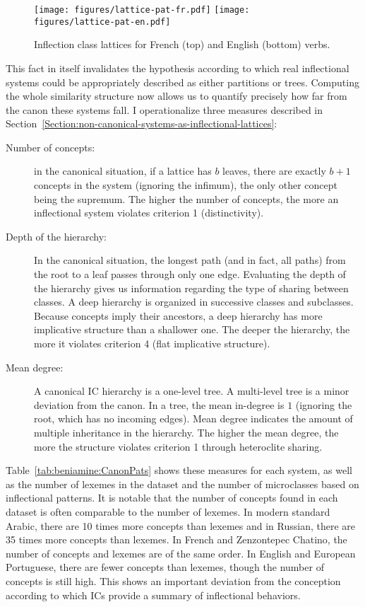\documentclass[output=paper]{langscibook}
\begin{document}
    \begin{figure}[p]
        \centering
        \texttt{[image: figures/lattice-pat-fr.pdf]}
        \texttt{[image: figures/lattice-pat-en.pdf]}
        \caption{Inflection class lattices for French (top) and English (bottom) verbs.}
        \label{fig:beniamine:treillisPatsFCA}
    \end{figure}

    This fact in itself invalidates the hypothesis according to which real inflectional systems could be appropriately described as either partitions or trees. Computing the whole similarity structure now allows us to quantify precisely how far from the canon these systems fall. I operationalize three measures described in Section~\ref{Section:non-canonical-systems-as-inflectional-lattices}:\largerpage[2]

    \begin{description}
        \item[Number of concepts:] in the canonical situation, if a lattice has $b$ leaves, there are exactly $b+1$ concepts in the system (ignoring the infimum), the only other concept being the supremum. The higher the number of concepts, the more an inflectional system violates criterion 1 (distinctivity).
        \item[Depth of the hierarchy:] In the canonical situation, the longest path (and in fact, all paths) from the root to a leaf passes through only one edge. Evaluating the depth of the hierarchy gives us information regarding the type of sharing between classes. A deep hierarchy is organized in successive classes and subclasses. Because concepts imply their ancestors, a deep hierarchy has more implicative structure than a shallower one. The deeper the hierarchy, the more it violates criterion 4 (flat implicative structure).
        \item[Mean degree:] A canonical IC hierarchy is a one-level tree. A multi-level tree is a minor deviation from the canon. In a tree, the mean in-degree is $1$ (ignoring the root, which has no incoming edges). Mean degree indicates the amount of multiple inheritance in the hierarchy. The higher the mean degree, the more the structure violates criterion 1 through heteroclite sharing.
    \end{description}

    Table~\ref{tab:beniamine:CanonPats} shows these measures for each system, as well as the number of lexemes in the dataset and the number of microclasses based on inflectional patterns. It is notable that the number of concepts found in each dataset is often comparable to the number of lexemes. In modern standard Arabic, there are 10 times more concepts than lexemes and in Russian, there are 35 times more concepts than lexemes. In French and Zenzontepec Chatino, the number of concepts and lexemes are of the same order. In English and European Portuguese, there are fewer concepts than lexemes, though the number of concepts is still high. This shows an important deviation from the conception according to which ICs provide a summary of inflectional behaviors.
\end{document}

